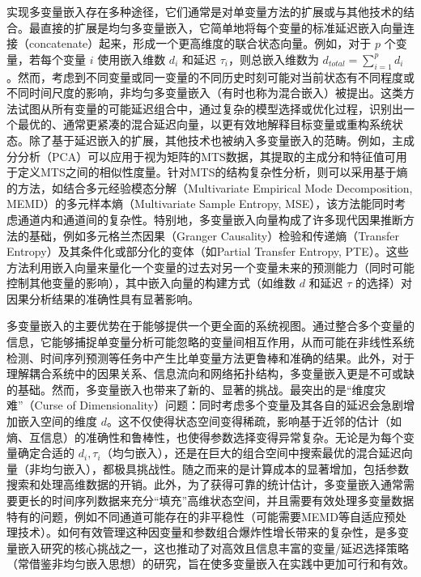 实现多变量嵌入存在多种途径，它们通常是对单变量方法的扩展或与其他技术的结合。最直接的扩展是均匀多变量嵌入，它简单地将每个变量的标准延迟嵌入向量连接（concatenate）起来，形成一个更高维度的联合状态向量。例如，对于 $p$ 个变量，若每个变量 $i$ 使用嵌入维数 $d_i$ 和延迟 $\tau_i$，则总嵌入维数为 $d_{total} = \sum_{i=1}^{p} d_i$。然而，考虑到不同变量或同一变量的不同历史时刻可能对当前状态有不同程度或不同时间尺度的影响，非均匀多变量嵌入（有时也称为混合嵌入）被提出。这类方法试图从所有变量的可能延迟组合中，通过复杂的模型选择或优化过程，识别出一个最优的、通常更紧凑的混合延迟向量，以更有效地解释目标变量或重构系统状态。除了基于延迟嵌入的扩展，其他技术也被纳入多变量嵌入的范畴。例如，主成分分析（PCA）可以应用于视为矩阵的MTS数据，其提取的主成分和特征值可用于定义MTS之间的相似性度量。针对MTS的结构复杂性分析，则可以采用基于熵的方法，如结合多元经验模态分解（Multivariate Empirical Mode Decomposition, MEMD\cite{rehman2010multivariate}）的多元样本熵（Multivariate Sample Entropy, MSE），该方法能同时考虑通道内和通道间的复杂性。特别地，多变量嵌入向量构成了许多现代因果推断方法的基础，例如多元格兰杰因果（Granger Causality）检验和传递熵（Transfer Entropy）及其条件化或部分化的变体（如Partial Transfer Entropy, PTE）。这些方法利用嵌入向量来量化一个变量的过去对另一个变量未来的预测能力（同时可能控制其他变量的影响），其中嵌入向量的构建方式（如维数 $d$ 和延迟 $\tau$ 的选择）对因果分析结果的准确性具有显著影响。

多变量嵌入的主要优势在于能够提供一个更全面的系统视图。通过整合多个变量的信息，它能够捕捉单变量分析可能忽略的变量间相互作用，从而可能在非线性系统检测、时间序列预测等任务中产生比单变量方法更鲁棒和准确的结果。此外，对于理解耦合系统中的因果关系、信息流向和网络拓扑结构，多变量嵌入更是不可或缺的基础。然而，多变量嵌入也带来了新的、显著的挑战。最突出的是“维度灾难”（Curse of Dimensionality）问题：同时考虑多个变量及其各自的延迟会急剧增加嵌入空间的维度 $d$。这不仅使得状态空间变得稀疏，影响基于近邻的估计（如熵、互信息）的准确性和鲁棒性，也使得参数选择变得异常复杂。无论是为每个变量确定合适的 $d_i, \tau_i$（均匀嵌入），还是在巨大的组合空间中搜索最优的混合延迟向量（非均匀嵌入），都极具挑战性。随之而来的是计算成本的显著增加，包括参数搜索和处理高维数据的开销。此外，为了获得可靠的统计估计，多变量嵌入通常需要更长的时间序列数据来充分“填充”高维状态空间，并且需要有效处理多变量数据特有的问题，例如不同通道可能存在的非平稳性（可能需要MEMD等自适应预处理技术）。如何有效管理这种因变量和参数组合爆炸性增长带来的复杂性，是多变量嵌入研究的核心挑战之一，这也推动了对高效且信息丰富的变量/延迟选择策略（常借鉴非均匀嵌入思想）的研究，旨在使多变量嵌入在实践中更加可行和有效。

